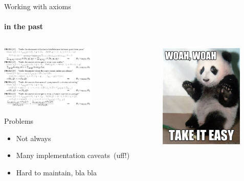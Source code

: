 \documentclass[english,xcolor=x11names]{beamer}
\begin{document}
\begin{frame}{Working with axioms\textellipsis~}
  \framesubtitle{in the past}
  \begin{columns}
    \begin{column}{0.6\textwidth}
      \begin{center}
        \includegraphics[width=4.5cm]{axiom-definitions.pdf}
      \end{center}
      \begin{block}{Problems}
        \begin{itemize}
          \item Not always \,\texttt{\texttrademark}
          \item Many implementation caveats~(uff!)
          \color{fg!60!bg}
          \item Hard to maintain, bla bla\textellipsis
        \end{itemize}
      \end{block}
    \end{column}
    \begin{column}{0.4\textwidth}
      \begin{center}
        \includegraphics[width=4cm]{meme-whoa-easy.jpg}
      \end{center}
    \end{column}
  \end{columns}
\end{frame}
\end{document}
